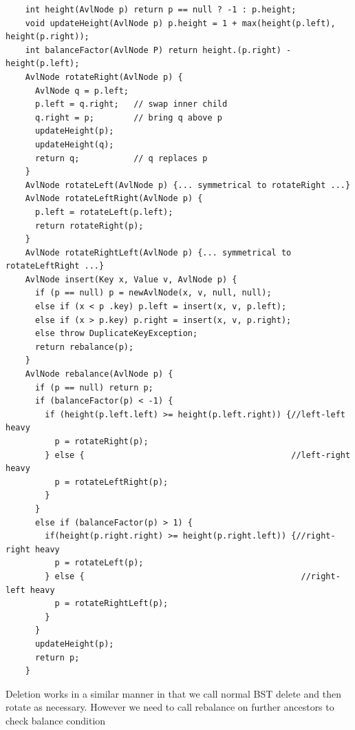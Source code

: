 \documentclass{article}
\begin{document}
  \begin{lstlisting}
    int height(AvlNode p) return p == null ? -1 : p.height;
    void updateHeight(AvlNode p) p.height = 1 + max(height(p.left), height(p.right));
    int balanceFactor(AvlNode P) return height.(p.right) - height(p.left);
    AvlNode rotateRight(AvlNode p) {
      AvlNode q = p.left;
      p.left = q.right;   // swap inner child
      q.right = p;        // bring q above p
      updateHeight(p);
      updateHeight(q);
      return q;           // q replaces p
    }
    AvlNode rotateLeft(AvlNode p) {... symmetrical to rotateRight ...}
    AvlNode rotateLeftRight(AvlNode p) {
      p.left = rotateLeft(p.left);
      return rotateRight(p);
    }
    AvlNode rotateRightLeft(AvlNode p) {... symmetrical to rotateLeftRight ...}
    AvlNode insert(Key x, Value v, AvlNode p) {
      if (p == null) p = newAvlNode(x, v, null, null);
      else if (x < p .key) p.left = insert(x, v, p.left);
      else if (x > p.key) p.right = insert(x, v, p.right);
      else throw DuplicateKeyException;
      return rebalance(p);
    }
    AvlNode rebalance(AvlNode p) {
      if (p == null) return p;
      if (balanceFactor(p) < -1) {
        if (height(p.left.left) >= height(p.left.right)) {//left-left heavy
          p = rotateRight(p);
        } else {                                          //left-right heavy
          p = rotateLeftRight(p);
        }
      }
      else if (balanceFactor(p) > 1) {
        if(height(p.right.right) >= height(p.right.left)) {//right-right heavy
          p = rotateLeft(p);
        } else {                                            //right-left heavy
          p = rotateRightLeft(p);
        }
      }
      updateHeight(p);
      return p;
    }
  \end{lstlisting}
  Deletion works in a similar manner in that we call normal BST delete and then rotate as necessary. However we need to call rebalance on further ancestors to check balance condition
\end{document}
